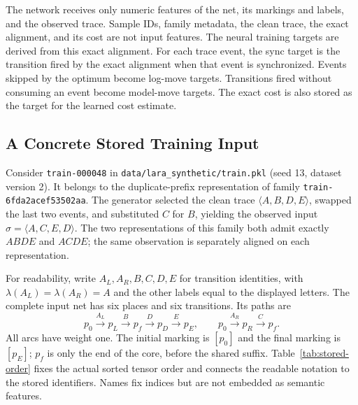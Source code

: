 \documentclass[11pt]{article}
\begin{document}
The network receives only numeric features of the net, its markings and labels,
and the observed trace. Sample IDs, family metadata, the clean trace, the exact
alignment, and its cost are not input features. The neural training targets are
derived from this exact alignment. For each
trace event, the sync target is the transition fired by the exact alignment
when that event is synchronized. Events skipped by the optimum become log-move
targets. Transitions fired without consuming an event become model-move
targets. The exact cost is also stored as the target for the learned cost
estimate.

\subsection{A Concrete Stored Training Input}
\label{app:concrete-input}

Consider \texttt{train-000048} in \texttt{data/lara\_synthetic/train.pkl}
(seed 13, dataset version 2). It belongs to the duplicate-prefix representation
of family \texttt{train-6fda2acef53502aa}. The generator selected the clean trace
$\langle A,B,D,E\rangle$, swapped the last two events, and substituted $C$ for
$B$, yielding the observed input $\sigma=\langle A,C,E,D\rangle$. The two
representations of this family both admit exactly $ABDE$ and $ACDE$; the same
observation is separately aligned on each representation.

For readability, write $A_L,A_R,B,C,D,E$ for transition identities, with
$\lambda(A_L)=\lambda(A_R)=A$ and the other labels equal to the displayed
letters. The complete input net has six places and six transitions. Its paths
are
\[
 p_0\xrightarrow{A_L}p_L\xrightarrow{B}p_f
 \xrightarrow{D}p_D\xrightarrow{E}p_E,
 \qquad p_0\xrightarrow{A_R}p_R\xrightarrow{C}p_f.
\]
All arcs have weight one. The initial marking is $[p_0]$ and the final marking
is $[p_E]$; $p_f$ is only the end of the core, before the shared suffix.
Table~\ref{tab:stored-order} fixes the actual sorted tensor order and connects
the readable notation to the stored identifiers. Names fix indices but are not
embedded as semantic features.
\end{document}
